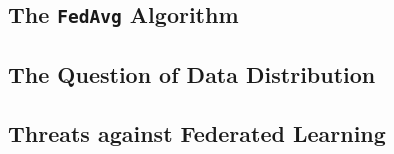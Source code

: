 \subsection{The \texttt{FedAvg} Algorithm\label{sec:bg.fl.fedavg}}


\subsection{The Question of Data Distribution\label{sec:bg.fl.data}}



\subsection{Threats against Federated Learning\label{sec:bg.fl.threats}}

